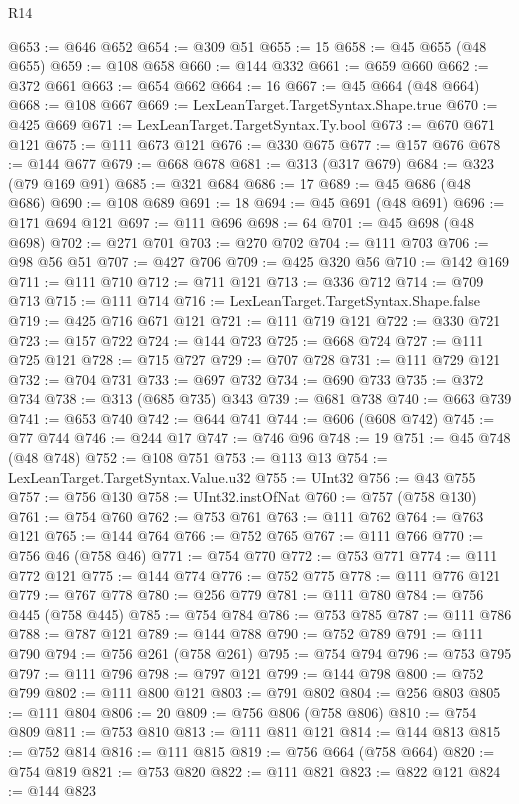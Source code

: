 \begin{lexlean}{R14}
\begin{coremodule}
@653 := @646 @652
@654 := @309 @51
@655 := 15
@658 := @45 @655 (@48 @655)
@659 := @108 @658
@660 := @144 @332
@661 := @659 @660
@662 := @372 @661
@663 := @654 @662
@664 := 16
@667 := @45 @664 (@48 @664)
@668 := @108 @667
@669 := LexLeanTarget.TargetSyntax.Shape.true
@670 := @425 @669
@671 := LexLeanTarget.TargetSyntax.Ty.bool
@673 := @670 @671 @121
@675 := @111 @673 @121
@676 := @330 @675
@677 := @157 @676
@678 := @144 @677
@679 := @668 @678
@681 := @313 (@317 @679)
@684 := @323 (@79 @169 @91)
@685 := @321 @684
@686 := 17
@689 := @45 @686 (@48 @686)
@690 := @108 @689
@691 := 18
@694 := @45 @691 (@48 @691)
@696 := @171 @694 @121
@697 := @111 @696
@698 := 64
@701 := @45 @698 (@48 @698)
@702 := @271 @701
@703 := @270 @702
@704 := @111 @703
@706 := @98 @56 @51
@707 := @427 @706
@709 := @425 @320 @56
@710 := @142 @169
@711 := @111 @710
@712 := @711 @121
@713 := @336 @712
@714 := @709 @713
@715 := @111 @714
@716 := LexLeanTarget.TargetSyntax.Shape.false
@719 := @425 @716 @671 @121
@721 := @111 @719 @121
@722 := @330 @721
@723 := @157 @722
@724 := @144 @723
@725 := @668 @724
@727 := @111 @725 @121
@728 := @715 @727
@729 := @707 @728
@731 := @111 @729 @121
@732 := @704 @731
@733 := @697 @732
@734 := @690 @733
@735 := @372 @734
@738 := @313 (@685 @735) @343
@739 := @681 @738
@740 := @663 @739
@741 := @653 @740
@742 := @644 @741
@744 := @606 (@608 @742)
@745 := @77 @744
@746 := @244 @17
@747 := @746 @96
@748 := 19
@751 := @45 @748 (@48 @748)
@752 := @108 @751
@753 := @113 @13
@754 := LexLeanTarget.TargetSyntax.Value.u32
@755 := UInt32
@756 := @43 @755
@757 := @756 @130
@758 := UInt32.instOfNat
@760 := @757 (@758 @130)
@761 := @754 @760
@762 := @753 @761
@763 := @111 @762
@764 := @763 @121
@765 := @144 @764
@766 := @752 @765
@767 := @111 @766
@770 := @756 @46 (@758 @46)
@771 := @754 @770
@772 := @753 @771
@774 := @111 @772 @121
@775 := @144 @774
@776 := @752 @775
@778 := @111 @776 @121
@779 := @767 @778
@780 := @256 @779
@781 := @111 @780
@784 := @756 @445 (@758 @445)
@785 := @754 @784
@786 := @753 @785
@787 := @111 @786
@788 := @787 @121
@789 := @144 @788
@790 := @752 @789
@791 := @111 @790
@794 := @756 @261 (@758 @261)
@795 := @754 @794
@796 := @753 @795
@797 := @111 @796
@798 := @797 @121
@799 := @144 @798
@800 := @752 @799
@802 := @111 @800 @121
@803 := @791 @802
@804 := @256 @803
@805 := @111 @804
@806 := 20
@809 := @756 @806 (@758 @806)
@810 := @754 @809
@811 := @753 @810
@813 := @111 @811 @121
@814 := @144 @813
@815 := @752 @814
@816 := @111 @815
@819 := @756 @664 (@758 @664)
@820 := @754 @819
@821 := @753 @820
@822 := @111 @821
@823 := @822 @121
@824 := @144 @823

\end{coremodule}
\end{lexlean}
